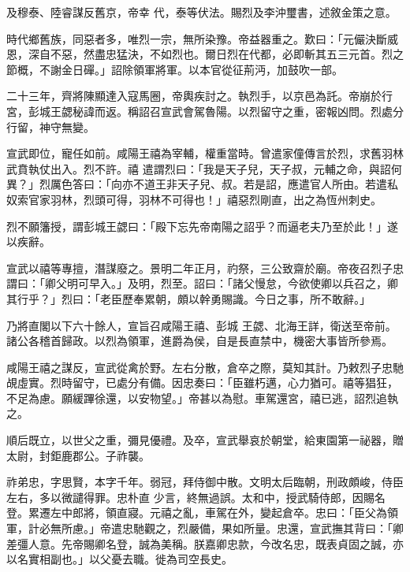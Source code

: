 \begin{pinyinscope}
 及穆泰、陸睿謀反舊京，帝幸
 代，泰等伏法。賜烈及李沖璽書，述敘金策之意。



 時代鄉舊族，同惡者多，唯烈一宗，無所染豫。帝益器重之。歎曰：「元儼決斷威恩，深自不惡，然盡忠猛決，不如烈也。爾日烈在代都，必即斬其五三元首。烈之節概，不謝金日磾。」詔除領軍將軍。以本官從征荊沔，加鼓吹一部。



 二十三年，齊將陳顯達入寇馬圈，帝輿疾討之。執烈手，以京邑為託。帝崩於行宮，彭城王勰秘諱而返。稱詔召宣武會駕魯陽。以烈留守之重，密報凶問。烈處分行留，神守無變。



 宣武即位，寵任如前。咸陽王禧為宰輔，權重當時。曾遣家僮傳言於烈，求舊羽林武賁執仗出入。烈不許。禧
 遣謂烈曰：「我是天子兒，天子叔，元輔之命，與詔何異？」烈厲色答曰：「向亦不道王非天子兒、叔。若是詔，應遣官人所由。若遣私奴索官家羽林，烈頭可得，羽林不可得也！」禧惡烈剛直，出之為恆州刺史。



 烈不願籓授，謂彭城王勰曰：「殿下忘先帝南陽之詔乎？而逼老夫乃至於此！」遂以疾辭。



 宣武以禧等專擅，潛謀廢之。景明二年正月，礿祭，三公致齋於廟。帝夜召烈子忠謂曰：「卿父明可早入。」及明，烈至。詔曰：「諸父慢怠，今欲使卿以兵召之，卿其行乎？」烈曰：「老臣歷奉累朝，頗以幹勇賜識。今日之事，所不敢辭。」



 乃將直閣以下六十餘人，宣旨召咸陽王禧、彭城
 王勰、北海王詳，衛送至帝前。諸公各稽首歸政。以烈為領軍，進爵為侯，自是長直禁中，機密大事皆所參焉。



 咸陽王禧之謀反，宣武從禽於野。左右分散，倉卒之際，莫知其計。乃敕烈子忠馳覘虛實。烈時留守，已處分有備。因忠奏曰：「臣雖朽邁，心力猶可。禧等猖狂，不足為慮。願緩蹕徐還，以安物望。」帝甚以為慰。車駕還宮，禧已逃，詔烈追執之。



 順后既立，以世父之重，彌見優禮。及卒，宣武舉哀於朝堂，給東園第一祕器，贈太尉，封鉅鹿郡公。子祚襲。



 祚弟忠，字思賢，本字千年。弱冠，拜侍御中散。文明太后臨朝，刑政頗峻，侍臣左右，多以微譴得罪。忠朴直
 少言，終無過誤。太和中，授武騎侍郎，因賜名登。累遷左中郎將，領直寢。元禧之亂，車駕在外，變起倉卒。忠曰：「臣父為領軍，計必無所慮。」帝遣忠馳觀之，烈嚴備，果如所量。忠還，宣武撫其背曰：「卿差彊人意。先帝賜卿名登，誠為美稱。朕嘉卿忠款，今改名忠，既表貞固之誠，亦以名實相副也。」以父憂去職。徙為司空長史。




\end{pinyinscope}
